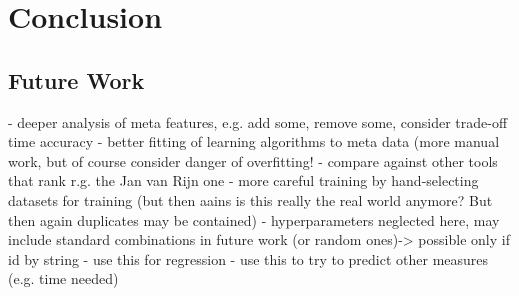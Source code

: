 \chapter{Conclusion}
\label{sec:conclusion}




\section{Future Work}
\label{sec:conclusion:future}

- deeper analysis of meta features, e.g. add some, remove some, consider trade-off time accuracy
- better fitting of learning algorithms to meta data (more manual work, but of course consider danger of overfitting!
- compare against other tools that rank r.g. the Jan van Rijn one
- more careful training by hand-selecting datasets for training (but then aains is this really the real world anymore? But then again duplicates may be contained)
- hyperparameters neglected here, may include standard combinations in future work (or random ones)-> possible only if id by string
- use this for regression
- use this to try to predict other measures (e.g. time needed)